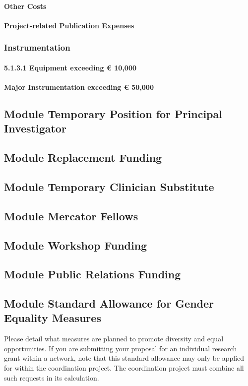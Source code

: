 \documentclass[11pt,a4paper]{article}
\begin{document}
\paragraph{	Other Costs}

\paragraph{Project-related Publication Expenses}

\subsubsection{Instrumentation}


\paragraph{5.1.3.1	Equipment exceeding € 10,000}

\paragraph{	Major Instrumentation exceeding € 50,000}


\subsection{Module Temporary Position for Principal Investigator}

\subsection{	Module Replacement Funding}

\subsection{	Module Temporary Clinician Substitute}

\subsection{	Module Mercator Fellows}

\subsection{	Module Workshop Funding}

\subsection{	Module Public Relations Funding}

\subsection{ Module Standard Allowance for Gender Equality Measures}
Please detail what measures are planned to promote diversity and equal opportunities.
If you are submitting your proposal for an individual research grant within a network, note that this standard allowance may only be applied for within the coordination project. The coordination project must combine all such requests in its calculation.
\end{document}
